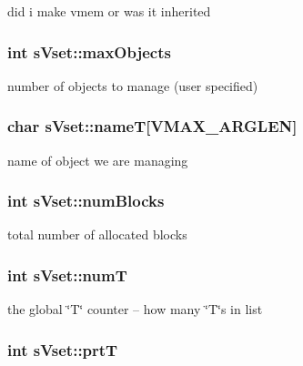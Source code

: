 did i make vmem or was it inherited 

\subsubsection[{max\+Objects}]{\setlength{\rightskip}{0pt plus 5cm}int s\+Vset\+::max\+Objects}\label{a00006_ae969fd9a7dc5ba70e7011267464813b8}


number of objects to manage (user specified) 

\subsubsection[{name\+T}]{\setlength{\rightskip}{0pt plus 5cm}char s\+Vset\+::name\+T[{\bf V\+M\+A\+X\+\_\+\+A\+R\+G\+L\+E\+N}]}\label{a00006_a3c0d8879ad1e04fbeefde96afa3d6f18}


name of object we are managing 

\subsubsection[{num\+Blocks}]{\setlength{\rightskip}{0pt plus 5cm}int s\+Vset\+::num\+Blocks}\label{a00006_a7c8f23f767a2a19c9e3f25367908d73c}


total number of allocated blocks 

\subsubsection[{num\+T}]{\setlength{\rightskip}{0pt plus 5cm}int s\+Vset\+::num\+T}\label{a00006_af1009ccf64c7ca388fca7f81c4fdd003}


the global \char`\"{}\+T\char`\"{} counter -- how many \char`\"{}\+T\char`\"{}s in list 

\subsubsection[{prt\+T}]{\setlength{\rightskip}{0pt plus 5cm}int s\+Vset\+::prt\+T}\label{a00006_a8a9db3d22f89bd9b7ea2fdab710d885f}


